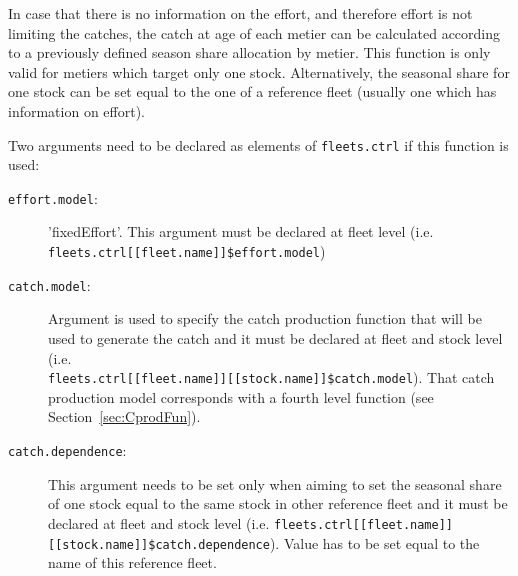  	 	In case that there is no information on the effort, and therefore effort is not limiting the catches, the catch at age of
 	 	each metier can be calculated according to a previously defined season share allocation by metier. 
 	 	This function is only valid for metiers which target only one stock.
 	 	Alternatively, the seasonal share for one stock can be set equal to the one of a reference fleet (usually one which has 
 	 	information on effort).
 	 	
 	 	Two arguments need to be declared as elements of \texttt{fleets.ctrl} if this function is used:
 	 	\begin{description}
			\item[\texttt{effort.model}:] 'fixedEffort'. 
			This argument must be declared at fleet level (i.e. \\ \texttt{fleets.ctrl[[fleet.name]]\$effort.model})
			\item[\texttt{catch.model}:] 
			Argument is used to specify the catch production function that will be used to generate the catch 
			and it must be declared at fleet and stock level (i.e. \\ \texttt{fleets.ctrl[[fleet.name]][[stock.name]]\$catch.model}). 
			That catch production model corresponds with a fourth level function (see Section~\ref{sec:CprodFun}).
			\item[\texttt{catch.dependence}:] This argument needs to be set only 
			  when aiming to set the seasonal share of one stock equal to the same stock in other
			  reference fleet and it must be declared at fleet and stock level 
			  (i.e. \texttt{fleets.ctrl[[fleet.name]][[stock.name]]\$catch.dependence}).
			  Value has to be set equal to the name of this reference fleet.
 	 	\end{description}
 	 	
	
